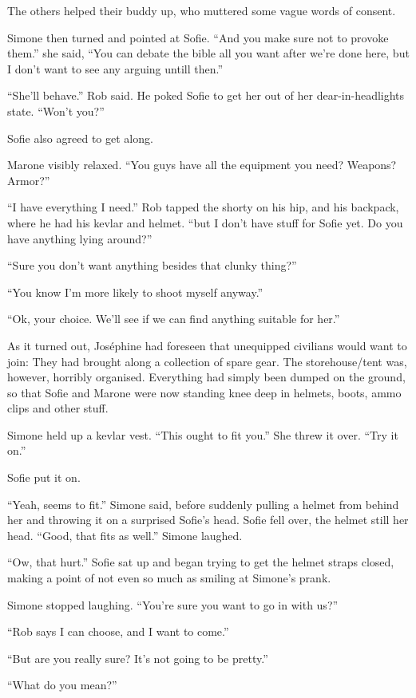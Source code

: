 \documentclass[letterpaper,12pt]{report}
\begin{document}
The others helped their buddy up, who muttered some vague words of consent.

Simone then turned and pointed at Sofie. ``And you make sure not to provoke them.'' she said, ``You can debate the bible all you want after we're done here, but I don't want to see any arguing untill then.''

``She'll behave.'' Rob said. He poked Sofie to get her out of her dear-in-headlights state. ``Won't you?''

Sofie also agreed to get along.

Marone visibly relaxed. ``You guys have all the equipment you need? Weapons? Armor?''

``I have everything I need.'' Rob tapped the shorty on his hip, and his backpack, where he had his kevlar and helmet. ``but I don't have stuff for Sofie yet. Do you have anything lying around?''

``Sure you don't want anything besides that clunky thing?''

``You know I'm more likely to shoot myself anyway.''

``Ok, your choice. We'll see if we can find anything suitable for her.''
\act

As it turned out, Jos\'ephine had foreseen that unequipped civilians would want to join: They had brought along a collection of spare gear. The storehouse/tent was, however, horribly organised. Everything had simply been dumped on the ground, so that Sofie and Marone were now standing knee deep in helmets, boots, ammo clips and other stuff.

Simone held up a kevlar vest. ``This ought to fit you.'' She threw it over. ``Try it on.''

Sofie put it on.

``Yeah, seems to fit.'' Simone said, before suddenly pulling a helmet from behind her and throwing it on a surprised Sofie's head. Sofie fell over, the helmet still her head. ``Good, that fits as well.'' Simone laughed.

``Ow, that hurt.'' Sofie sat up and began trying to get the helmet straps closed, making a point of not even so much as smiling at Simone's prank.

Simone stopped laughing. ``You're sure you want to go in with us?''

``Rob says I can choose, and I want to come.''

``But are you really sure? It's not going to be pretty.''

``What do you mean?''
\end{document}
